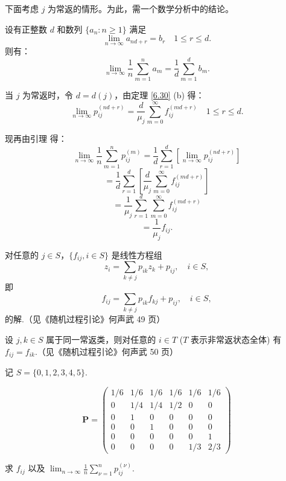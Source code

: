 \documentclass[lang=cn,10pt,thmcnt=section]{elegantbook}
\begin{document}
下面考虑 $j$ 为常返的情形。为此，需一个数学分析中的结论。
\begin{lemma}
	设有正整数 $d$ 和数列 $\{a_n : n \geq 1\}$ 满足
\[
\lim_{n \to \infty} a_{nd+r} = b_r \quad 1 \leq r \leq d.
\]
则有：
\[
\lim_{n \to \infty} \frac{1}{n} \sum_{m=1}^{n} a_m = \frac{1}{d} \sum_{m=1}^{d} b_m.
\] 
\end{lemma}

当 $j$ 为常返时，令 $d = d(j)$，由定理 \ref{6.30} (b) 得：
\[
\lim_{n \to \infty} p_{ij}^{(nd+r)} = \frac{d}{\mu_j} \sum_{m=0}^{\infty} f_{ij}^{(md+r)} \quad 1 \leq r \leq d.
\]

现再由引理 得：
\[
\lim_{n \to \infty} \frac{1}{n} \sum_{m=1}^{n} p_{ij}^{(m)} = \frac{1}{d} \sum_{r=1}^{d} \left[ \lim_{n \to \infty} p_{ij}^{(nd+r)} \right]
\]
\[
= \frac{1}{d} \sum_{r=1}^{d} \left[ \frac{d}{\mu_j} \sum_{m=0}^{\infty} f_{ij}^{(md+r)} \right]
\]
\[
= \frac{1}{\mu_j} \sum_{r=1}^{d} \sum_{m=0}^{\infty} f_{ij}^{(md+r)}
\]
\[
= \frac{1}{\mu_j} f_{ij}.
\]
\begin{theorem}
	对任意的 $j \in S$，$\{f_{ij}, i \in S\}$ 是线性方程组
\[
z_i = \sum_{k \neq j} p_{ik} z_k + p_{ij}, \quad i \in S,
\]
即
\[
f_{ij} = \sum_{k \neq j} p_{ik} f_{kj} + p_{ij}, \quad i \in S,
\]
的解.（见《随机过程引论》何声武 49 页）

\end{theorem}
\begin{theorem}
	设 $j, k \in S$ 属于同一常返类，则对任意的 $i \in T$ ($T$ 表示非常返状态全体) 有 $f_{ij} = f_{ik}$.（见《随机过程引论》何声武 50 页）

\end{theorem}
\begin{example}
	记 $S = \{0, 1, 2, 3, 4, 5\}$.

\[
\mathbf{P} = \begin{pmatrix}
1/6 & 1/6 & 1/6 & 1/6 & 1/6 & 1/6 \\
0 & 1/4 & 1/4 & 1/2 & 0 & 0 \\
0 & 1 & 0 & 0 & 0 & 0 \\
0 & 0 & 1 & 0 & 0 & 0 \\
0 & 0 & 0 & 0 & 0 & 1 \\
0 & 0 & 0 & 0 & 1/3 & 2/3
\end{pmatrix}
\]

求 $f_{ij}$ 以及 $\lim_{n \to \infty} \frac{1}{n} \sum_{\nu=1}^{n} p_{ij}^{(\nu)}$.

\end{example}
\end{document}
